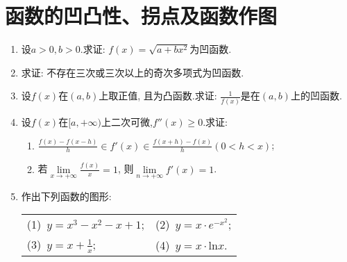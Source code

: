 \section{函数的凹凸性、拐点及函数作图}
\begin{enumerate}
	\item 设$a>0,b>0$.求证: $f(x)=\sqrt{a+bx^2}$为凹函数.
	\item 求证: 不存在三次或三次以上的奇次多项式为凹函数.
	\item 设$f(x)$在$(a,b)$上取正值, 且为凸函数.求证: $\frac{1}{f(x)}$是在$(a,b)$上的凹函数.
	\item 设$f(x)$在$[a,+\infty)$上二次可微,$f''(x)\ge 0$.求证:
	\begin{enumerate}
	\item $\frac{f(x)-f(x-h)}{h}\in f'(x)\in \frac{f(x+h)-f(x)}{h}(0<h<x)$;
	\item 若$\lim\limits_{x\rightarrow +\infty}\frac{f(x)}{x}=1$, 则$\lim\limits_{n\rightarrow +\infty}f'(x)=1$.
	\end{enumerate}
	\item 作出下列函数的图形:
	\begin{table}[H]
		\begin{tabular}{ll}
			\qquad	(1)\ $y=x^3-x^2-x+1$;\qquad \qquad& (2)\ $y=x\cdot e^{-x^2}$;\\
			\qquad (3)\ $y=x+\frac{1}{x}$; \qquad \qquad &(4)\ $y=x\cdot \mathrm{ln}x$.
		\end{tabular}
	\end{table}

\end{enumerate}


